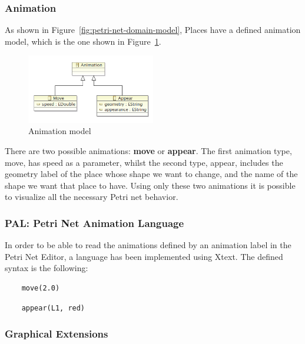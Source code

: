 \subsubsection{Animation}

As shown in Figure~\ref{fig:petri-net-domain-model}, Places have a defined animation model, which is the one shown in Figure~\ref{fig:animation-model}.

\begin{figure}[htp]
\begin{center}
  \includegraphics[width=0.5\textwidth]{image/animation_model.png}
  \caption{Animation model}
  \label{fig:animation-model}
\end{center}
\end{figure}

There are two possible animations: \textbf{move} or \textbf{appear}. The first animation type, move, has speed as a parameter, whilst the second type, appear, includes the geometry label of the place whose shape we want to change, and the name of the shape we want that place to have. Using only these two animations it is possible to visualize all the necessary Petri net behavior.

\subsubsection{PAL: Petri Net Animation Language}

In order to be able to read the animations defined by an animation label in the Petri Net Editor, a language  has been implemented using Xtext. The defined syntax is the following:

\begin{lstlisting}
	move(2.0)
\end{lstlisting}

\begin{lstlisting}
	appear(L1, red)
\end{lstlisting}

\subsubsection{Graphical Extensions}

